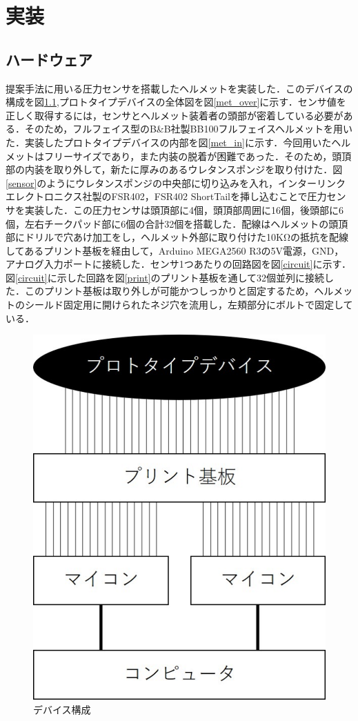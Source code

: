 \chapter{実装}
\label{make}
\section{ハードウェア}
提案手法に用いる圧力センサを搭載したヘルメットを実装した．このデバイスの構成を図\ref{device},プロトタイプデバイスの全体図を図\ref{met_over}に示す．センサ値を正しく取得するには，センサとヘルメット装着者の頭部が密着している必要がある．そのため，フルフェイス型のB\&B社製BB100フルフェイスヘルメットを用いた．実装したプロトタイプデバイスの内部を図\ref{met_in}に示す．今回用いたヘルメットはフリーサイズであり，また内装の脱着が困難であった．そのため，頭頂部の内装を取り外して，新たに厚みのあるウレタンスポンジを取り付けた．図\ref{sensor}のようにウレタンスポンジの中央部に切り込みを入れ，インターリンク エレクトロニクス社製のFSR402，FSR402 ShortTailを挿し込むことで圧力センサを実装した．この圧力センサは頭頂部に4個，頭頂部周囲に16個，後頭部に6個，左右チークパッド部に6個の合計32個を搭載した．配線はヘルメットの頭頂部にドリルで穴あけ加工をし，ヘルメット外部に取り付けた10KΩの抵抗を配線してあるプリント基板を経由して，Arduino MEGA2560 R3の5V電源，GND，アナログ入力ポートに接続した．センサ1つあたりの回路図を図\ref{circuit}に示す．図\ref{circuit}に示した回路を図\ref{print}のプリント基板を通して32個並列に接続した．このプリント基板は取り外しが可能かつしっかりと固定するため，ヘルメットのシールド固定用に開けられたネジ穴を流用し，左頬部分にボルトで固定している．

\begin{figure}[!t]
  \begin{center}
    \includegraphics[width=0.5\linewidth]{figure/device.eps}
  \end{center}
  \caption{デバイス構成}
  \label{device}
\end{figure}

